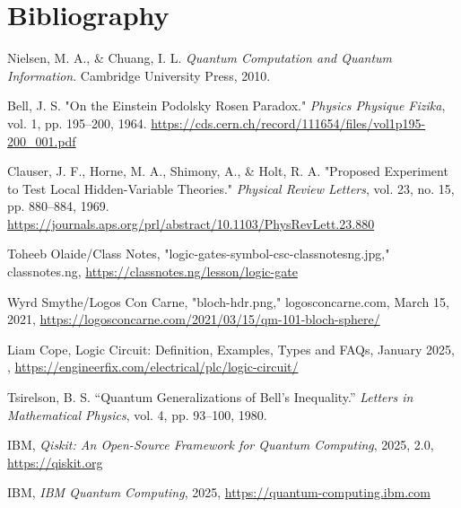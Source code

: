 \documentclass[12pt]{article}
\begin{document}
\section{Bibliography}
\begin{thebibliography}{1} %

     Nielsen, M. A., \& Chuang, I. L. \textit{Quantum Computation and Quantum Information}. Cambridge University Press, 2010.

     Bell, J. S. "On the Einstein Podolsky Rosen Paradox." \textit{Physics Physique Fizika}, vol. 1, pp. 195–200, 1964. \url{https://cds.cern.ch/record/111654/files/vol1p195-200_001.pdf}

     Clauser, J. F., Horne, M. A., Shimony, A., \& Holt, R. A. "Proposed Experiment to Test Local Hidden-Variable Theories." \textit{Physical Review Letters}, vol. 23, no. 15, pp. 880–884, 1969. \url{https://journals.aps.org/prl/abstract/10.1103/PhysRevLett.23.880}

     Toheeb Olaide/Class Notes, "logic-gates-symbol-csc-classnotesng.jpg," classnotes.ng, \url{https://classnotes.ng/lesson/logic-gate}

     Wyrd Smythe/Logos Con Carne, "bloch-hdr.png," logosconcarne.com, March 15, 2021, \url{https://logosconcarne.com/2021/03/15/qm-101-bloch-sphere/}

     Liam Cope, Logic Circuit: Definition, Examples, Types and FAQs, January 2025, , \url{https://engineerfix.com/electrical/plc/logic-circuit/}

     Tsirelson, B. S. “Quantum Generalizations of Bell’s Inequality.” \textit{Letters in Mathematical Physics}, vol. 4, pp. 93–100, 1980.

     IBM, \textit{Qiskit: An Open-Source Framework for Quantum Computing}, 2025, 2.0, \url{https://qiskit.org}

     IBM, \textit{IBM Quantum Computing}, 2025, \url{https://quantum-computing.ibm.com}

\end{thebibliography}
\end{document}
